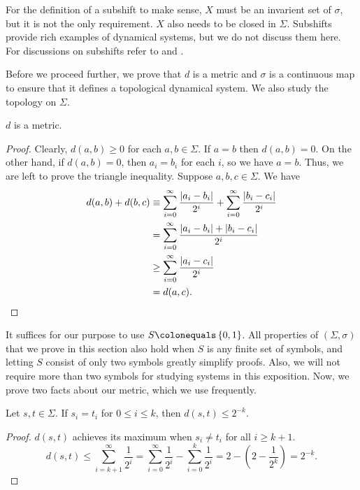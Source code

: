 \documentclass[10pt,twoside]{book}
\begin{document}
For the definition of a subshift to make sense, $X$ must be an invarient set of $\sigma$, but it is not the only requirement.
$X$ also needs to be closed in $\Sigma$.
Subshifts provide rich examples of dynamical systems, but we do not discuss them here.
For discussions on subshifts refer to \citet{kitchens} and \citet{lind}.

Before we proceed further, we prove that $d$ is a metric and $\sigma$ is a continuous map to ensure that it defines a topological dynamical system.
We also study the topology on $\Sigma$.
\begin{proposition}
  $d$ is a metric.
  \label{prop:symb-metric}
  \begin{proof}
    Clearly, $d(a,b) \geq 0$ for each $a,b \in \Sigma$.
    If $a = b$ then $d(a,b) = 0$.
    On the other hand, if $d(a,b) = 0$, then $a_i = b_i$ for each $i$, so we have $a = b$.
    Thus, we are left to prove the triangle inequality.
    Suppose $a,b,c \in \Sigma$.
    We have
    \begin{align*}
      d(a,b) + d(b,c)
      &\equiv \sum\limits_{i = 0}^{\infty} \frac{\left | a_i - b_i \right |}{2^i}  +  \sum\limits_{i = 0}^{\infty} \frac{\left | b_i - c_i \right |}{2^i}  \\
      &= \sum\limits_{i = 0}^{\infty} \frac{\left | a_i - b_i \right | + \left | b_i - c_i \right |}{2^i}  \\
      &\geq \sum\limits_{i = 0}^{\infty} \frac{\left | a_i - c_i \right |}{2^i}  \\
      &= d(a,c).
    \end{align*}
  \end{proof}
\end{proposition}
It suffices for our purpose to use $S \ceq \set{0,1}$.
All properties of $(\Sigma, \sigma)$ that we prove in this section also hold when $S$ is any finite set of symbols, and letting $S$ consist of only two symbols greatly simplify proofs.
Also, we will not require more than two symbols for studying systems in this exposition.
Now, we prove two facts about our metric, which we use frequently.
\begin{proposition}
  Let $s, t \in \Sigma$.
  If $s_i = t_i$ for $0 \leq i \leq k$, then $d(s,t) \leq 2^{-k}$.
  \label{prop:symbol-bound1}
  \begin{proof}
    $d(s,t)$ achieves its maximum when $s_i \neq t_i$ for all $i \geq k+1$.
    \begin{equation*}
      d(s,t) 
      \leq \sum\limits_{i = k+1}^{\infty} \frac{1}{2^i}
      = \sum\limits_{i = 0}^{\infty} \frac{1}{2^i} - \sum\limits_{i = 0}^{k} \frac{1}{2^i}
      = 2 - (2 - \frac{1}{2^{k}})
      = 2^{-k}.
    \end{equation*}
  \end{proof}
\end{proposition}
\end{document}
